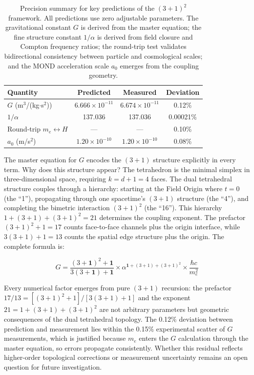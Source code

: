 \begin{table}[H]
\centering
\begin{tabular*}{0.95\textwidth}{@{\extracolsep{\fill}} lccc @{}}
\toprule
\textbf{Quantity} & \textbf{Predicted} & \textbf{Measured} & \textbf{Deviation} \\
\midrule
$G$ (m$^3$/(kg$\cdot$s$^2$)) & $6.666 \times 10^{-11}$ & $6.674 \times 10^{-11}$ & 0.12\% \\
$1/\alpha$ & 137.036 & 137.036 & 0.00021\% \\
Round-trip $m_e \leftrightarrow H$ & --- & --- & 0.10\% \\
$a_0$ (m/s$^2$) & $1.20 \times 10^{-10}$ & $1.20 \times 10^{-10}$ & 0.08\% \\
\bottomrule
\end{tabular*}
\caption{Precision summary for key predictions of the $(3+1)^2$ framework. All predictions use zero adjustable parameters. The gravitational constant $G$ is derived from the master equation; the fine structure constant $1/\alpha$ is derived from field closure and Compton frequency ratios; the round-trip test validates bidirectional consistency between particle and cosmological scales; and the MOND acceleration scale $a_0$ emerges from the coupling geometry.}
\label{tab:precision-summary}
\end{table}

The master equation for $G$ encodes the $(3+1)$ structure explicitly in every term. Why does this structure appear? The tetrahedron is the minimal simplex in three-dimensional space, requiring $k = d + 1 = 4$ faces. The dual tetrahedral structure couples through a hierarchy: starting at the Field Origin where $t = 0$ (the ``1''), propagating through one spacetime's $(3+1)$ structure (the ``4''), and completing the bimetric interaction $(3+1)^2$ (the ``16''). This hierarchy $1 + (3+1) + (3+1)^2 = 21$ determines the coupling exponent. The prefactor $(3+1)^2 + 1 = 17$ counts face-to-face channels plus the origin interface, while $3(3+1) + 1 = 13$ counts the spatial edge structure plus the origin. The complete formula is:

\begin{equation}
G = \frac{(3+\mathbf{1})^2 + \mathbf{1}}{3(3+\mathbf{1}) + \mathbf{1}} \times \alpha^{\mathbf{1}+(3+1)+(3+1)^2} \times \frac{\hbar c}{m_e^2}
\label{eq:G-precision}
\end{equation}

Every numerical factor emerges from pure $(3+1)$ recursion: the prefactor $17/13 = [(3+1)^2 + 1] / [3(3+1) + 1]$ and the exponent $21 = 1 + (3+1) + (3+1)^2$ are not arbitrary parameters but geometric consequences of the dual tetrahedral topology. The 0.12\% deviation between prediction and measurement lies within the 0.15\% experimental scatter of $G$ measurements, which is justified because $m_e$ enters the $G$ calculation through the master equation, so errors propagate consistently. Whether this residual reflects higher-order topological corrections or measurement uncertainty remains an open question for future investigation.

